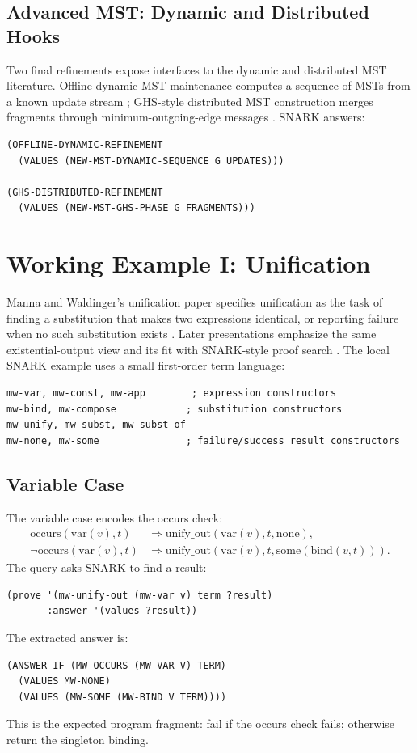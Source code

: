 \documentclass[runningheads]{llncs}
\begin{document}
\subsection{Advanced MST: Dynamic and Distributed Hooks}

Two final refinements expose interfaces to the dynamic and distributed MST
literature.  Offline dynamic MST maintenance computes a sequence of MSTs from
a known update stream \cite{Eppstein1994}; GHS-style distributed MST
construction merges fragments through minimum-outgoing-edge messages
\cite{GallagerHumbletSpira1983}.
SNARK answers:
\begin{lstlisting}
(OFFLINE-DYNAMIC-REFINEMENT
  (VALUES (NEW-MST-DYNAMIC-SEQUENCE G UPDATES)))

(GHS-DISTRIBUTED-REFINEMENT
  (VALUES (NEW-MST-GHS-PHASE G FRAGMENTS)))
\end{lstlisting}

\section{Working Example I: Unification}

Manna and Waldinger's unification paper specifies unification as the task of
finding a substitution that makes two expressions identical, or reporting
failure when no such substitution exists \cite{MannaWaldinger1981}.  Later
presentations emphasize the same existential-output view and its fit with
SNARK-style proof search \cite{Waldinger2021}.  The local SNARK example uses a
small first-order term language:
\begin{lstlisting}
mw-var, mw-const, mw-app        ; expression constructors
mw-bind, mw-compose            ; substitution constructors
mw-unify, mw-subst, mw-subst-of
mw-none, mw-some               ; failure/success result constructors
\end{lstlisting}

\subsection{Variable Case}

The variable case encodes the occurs check:
\begin{align*}
  \mathrm{occurs}(\mathrm{var}(v),t)
    &\Rightarrow \mathrm{unify\_out}(\mathrm{var}(v),t,\mathrm{none}),\\
  \neg\mathrm{occurs}(\mathrm{var}(v),t)
    &\Rightarrow \mathrm{unify\_out}(\mathrm{var}(v),t,
       \mathrm{some}(\mathrm{bind}(v,t))).
\end{align*}
The query asks SNARK to find a result:
\begin{lstlisting}
(prove '(mw-unify-out (mw-var v) term ?result)
       :answer '(values ?result))
\end{lstlisting}
The extracted answer is:
\begin{lstlisting}
(ANSWER-IF (MW-OCCURS (MW-VAR V) TERM)
  (VALUES MW-NONE)
  (VALUES (MW-SOME (MW-BIND V TERM))))
\end{lstlisting}
This is the expected program fragment: fail if the occurs check fails;
otherwise return the singleton binding.
\end{document}
